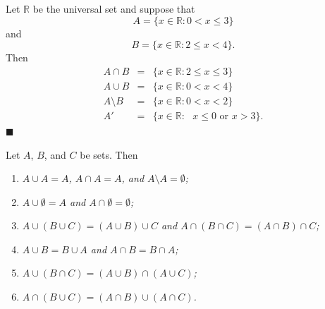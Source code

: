 Let ${\mathbb R}$ be the universal set and suppose that
$$
A = \{ x \in {\mathbb R} : 0 < x \leq 3 \}
$$
and
$$
B = \{ x \in {\mathbb R} : 2 \leq x < 4 \}.
$$
Then
\begin{eqnarray*}
A \cap B & = & \{ x \in {\mathbb R} : 2 \leq x \leq 3 \} \\
A \cup B & = & \{ x \in {\mathbb R} : 0 < x < 4 \} \\
A \setminus B & = & \{ x \in {\mathbb R} : 0 < x < 2  \} \\
A' & = & \{ x \in {\mathbb R} : \mbox{ $x \leq 0$ or $x > 3$
} \}.
\end{eqnarray*}
\hspace{\fill} $\blacksquare$
 
\begin{proposition}\label{sets_theorem_1}
Let $A$, $B$, and $C$ be sets. Then
\begin{enumerate}
 
\rm \item \it
$A \cup A = A$, $A \cap A = A$, and $A \setminus A = \emptyset$;
 
\rm \item \it
$A \cup \emptyset = A$ and $A \cap \emptyset = \emptyset$;
 
\rm \item \it
$A \cup (B \cup C) = (A \cup B) \cup C$ and  $A \cap (B \cap C) = (A \cap B) \cap C$;
 
\rm \item \it
$A \cup B = B \cup A$ and $A \cap B = B \cap A$;
 
\rm \item \it
$A \cup (B \cap C) = (A \cup B) \cap (A \cup C)$;
 
\rm \item \it
$A \cap (B \cup C) = (A \cap B) \cup (A \cap C)$.
 
\end{enumerate}
\end{proposition}

